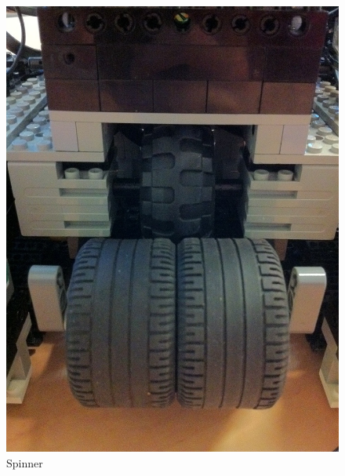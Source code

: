 \documentclass[12pt, a4paper, titlepage]{article}
\begin{document}
\begin{figure}[ht]
\begin{minipage}[b]{0.5\linewidth}
\centering
\includegraphics[scale=0.2]{images/robot/spinner.jpg}
\caption{Spinner}
\label{fig:spinner}
\end{minipage}
\hspace{0.5cm}
\begin{minipage}[b]{0.5\linewidth}
\centering

\end{minipage}
\end{figure}
\end{document}
